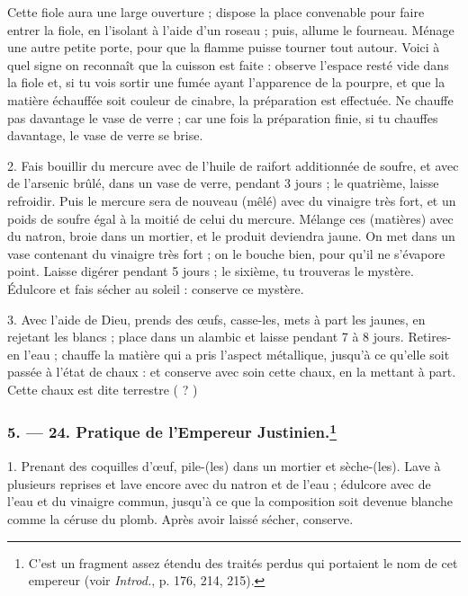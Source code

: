 \documentclass[a4paper, 11pt, oneside, polutonikogreek, french]{article}
\begin{document}
Cette fiole aura une large ouverture ; dispose la place convenable pour faire entrer la fiole, en l'isolant à l'aide d'un roseau ; puis, allume le fourneau. Ménage une autre petite porte, pour que la flamme puisse tourner tout autour. Voici à quel signe on reconnaît que la cuisson est faite : observe l'espace resté vide dans la fiole et, si tu vois sortir une fumée ayant l'apparence de la pourpre, et que la matière échauffée soit couleur de cinabre, la préparation est effectuée. Ne chauffe pas davantage le vase de verre ; car une fois la préparation finie, si tu chauffes davantage, le vase de verre se brise.

2. Fais bouillir du mercure avec de l'huile de raifort additionnée de soufre, et avec de l'arsenic brûlé, dans un vase de verre, pendant 3 jours ; le quatrième, laisse refroidir. Puis le mercure sera de nouveau (mêlé) avec du vinaigre très fort, et un poids de soufre égal à la moitié de celui du mercure. Mélange ces (matières) avec du natron, broie dans un mortier, et le produit deviendra jaune. On met dans un vase contenant du vinaigre très fort ; on le bouche bien, pour qu'il ne s'évapore point. Laisse digérer pendant 5 jours ; le sixième, tu trouveras le mystère. Édulcore et fais sécher au soleil : conserve ce mystère.

3. Avec l'aide de Dieu, prends des œufs, casse-les, mets à part les jaunes, en rejetant les blancs ; place dans un alambic et laisse pendant 7 à 8 jours. Retires-en l'eau ; chauffe la matière qui a pris l'aspect métallique, jusqu'à ce qu'elle soit passée à l'état de chaux : et conserve avec soin cette chaux, en la mettant à part. Cette chaux est dite terrestre ( ? )

\bigskip
\centerline{\EightStarTaper}
\centerline{\EightStarTaper\EightStarTaper}
\bigskip

\subsubsection[5. --- 24. Pratique de l'Empereur Justinien.]{5. --- 24. Pratique de l'Empereur Justinien.\footnote{C'est un fragment assez étendu des traités perdus qui portaient le nom de cet empereur (voir \emph{Introd.}, p. 176, 214, 215).}}

1. Prenant des coquilles d'œuf, pile-(les) dans un mortier et sèche-(les). Lave à plusieurs reprises et lave encore avec du natron et de l'eau ; édulcore avec de l'eau et du vinaigre commun, jusqu'à ce que la composition soit devenue blanche comme la céruse du plomb. Après avoir laissé sécher, conserve.
\end{document}
